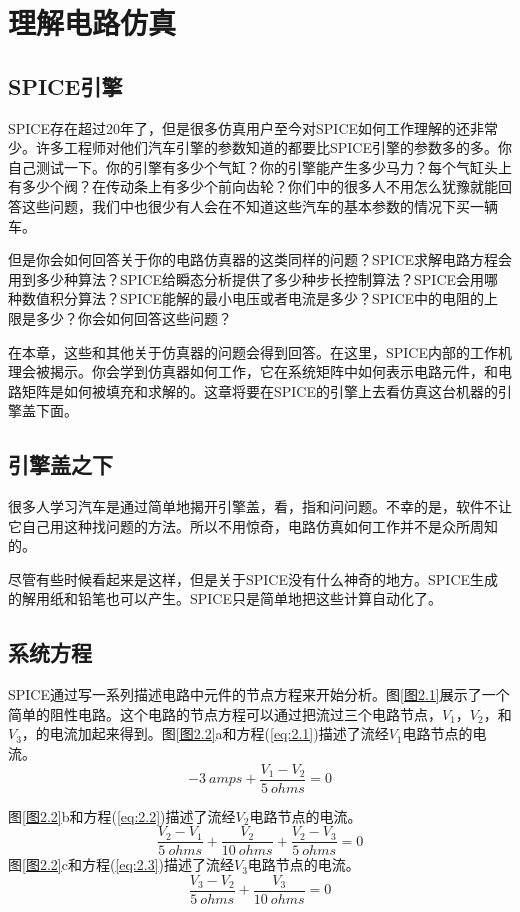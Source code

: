 \chapter{理解电路仿真}
\label{chap:2}
\section{SPICE引擎}
SPICE存在超过20年了，但是很多仿真用户至今对SPICE如何工作理解的还非常少。许多工程师对他们汽车引擎的参数知道的都要比SPICE引擎的参数多的多。你自己测试一下。你的引擎有多少个气缸？你的引擎能产生多少马力？每个气缸头上有多少个阀？在传动条上有多少个前向齿轮？你们中的很多人不用怎么犹豫就能回答这些问题，我们中也很少有人会在不知道这些汽车的基本参数的情况下买一辆车。

但是你会如何回答关于你的电路仿真器的这类同样的问题？SPICE求解电路方程会用到多少种算法？SPICE给瞬态分析提供了多少种步长控制算法？SPICE会用哪种数值积分算法？SPICE能解的最小电压或者电流是多少？SPICE中的电阻的上限是多少？你会如何回答这些问题？

在本章，这些和其他关于仿真器的问题会得到回答。在这里，SPICE内部的工作机理会被揭示。你会学到仿真器如何工作，它在系统矩阵中如何表示电路元件，和电路矩阵是如何被填充和求解的。这章将要在SPICE的引擎上去看仿真这台机器的引擎盖下面。

\section{引擎盖之下}
很多人学习汽车是通过简单地揭开引擎盖，看，指和问问题。不幸的是，软件不让它自己用这种找问题的方法。所以不用惊奇，电路仿真如何工作并不是众所周知的。

尽管有些时候看起来是这样，但是关于SPICE没有什么神奇的地方。SPICE生成的解用纸和铅笔也可以产生。SPICE只是简单地把这些计算自动化了。

\section{系统方程}
SPICE通过写一系列描述电路中元件的节点方程来开始分析。图\ref{图2.1}展示了一个简单的阻性电路。这个电路的节点方程可以通过把流过三个电路节点，$V_1$，$V_2$，和$V_3$，的电流加起来得到。图\ref{图2.2}a和方程(\ref{eq:2.1})描述了流经$V_1$电路节点的电流。
\begin{equation}
    -3\ amps + \frac{V_1-V_2}{5\ ohms} = 0
    \label{eq:2.1}
\end{equation}

图\ref{图2.2}b和方程(\ref{eq:2.2})描述了流经$V_2$电路节点的电流。
\begin{equation}
    \frac{V_2-V_1}{5\ ohms}+\frac{V_2}{10\ ohms}+\frac{V_2-V_3}{5\ ohms}=0
    \label{eq:2.2}
\end{equation}
图\ref{图2.2}c和方程(\ref{eq:2.3})描述了流经$V_3$电路节点的电流。
\begin{equation}
    \frac{V_3-V_2}{5\ ohms}+\frac{V_3}{10\ ohms}=0
    \label{eq:2.3}
\end{equation}

